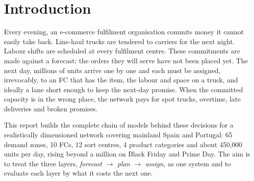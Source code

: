 \section{Introduction}\label{sec:intro}

Every evening, an e-commerce fulfilment organisation commits money it cannot easily take back.
Line-haul trucks are tendered to carriers for the next night.
Labour shifts are scheduled at every fulfilment centre.
These commitments are made against a forecast; the orders they will serve have not been placed yet.
The next day, millions of units arrive one by one and each must be assigned, irrevocably, to an FC that has the item, the labour and space on a truck, and ideally a lane short enough to keep the next-day promise.
When the committed capacity is in the wrong place, the network pays for spot trucks, overtime, late deliveries and broken promises.

This report builds the complete chain of models behind these decisions for a realistically dimensioned network covering mainland Spain and Portugal:
65 demand zones, 10 FCs, 12 sort centres, 4 product categories and about 450,000 units per day, rising beyond a million on Black Friday and Prime Day.
The aim is to treat the three layers, \emph{forecast} $\rightarrow$ \emph{plan} $\rightarrow$ \emph{assign}, as one system and to evaluate each layer by what it costs the next one.

